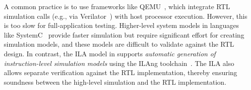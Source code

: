 A common practice is to use frameworks like QEMU~\cite{bellard2005qemu}, which integrate RTL simulation calls (e.g., via Verilator~\cite{verilator}) with host processor execution. However, this is too slow for full-application testing.
Higher-level system models in languages like SystemC~\cite{SystemC} provide faster simulation but require significant effort for creating simulation models, and these models are difficult to validate against the RTL design.
In contrast, the ILA model in {\TLA} supports \emph{automatic generation of instruction-level simulation models} using the ILAng toolchain~\cite{huang2019ilang}. The ILA also allows separate verification against the RTL implementation, thereby ensuring soundness between the high-level simulation and the RTL implementation. 

